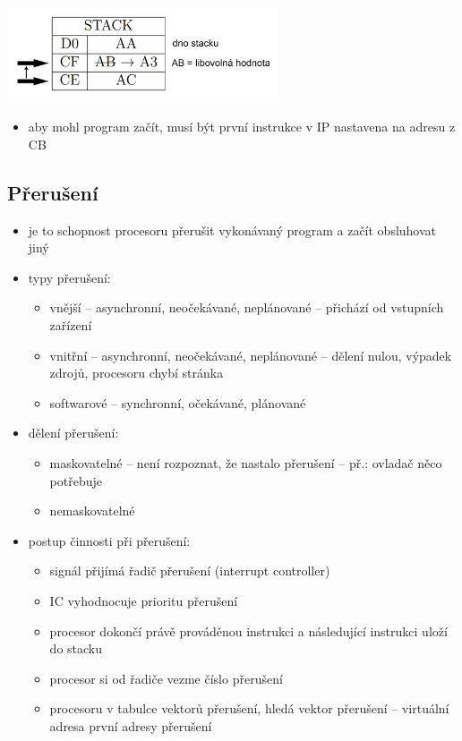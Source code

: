 \documentclass[a4paper,12pt]{article}
\providecommand{\tightlist}{%
\setlength{\itemsep}{0pt}\setlength{\parskip}{0pt}}
\begin{document}
\includegraphics[width=8cm]{ref/podprogram-stack.png}

\begin{itemize}
\tightlist
\item aby mohl program začít, musí být první instrukce v IP nastavena na
  adresu z CB
\end{itemize}

\subsection{Přerušení}

\begin{itemize}
\tightlist
\item je to schopnost procesoru přerušit vykonávaný program a začít
  obsluhovat jiný
\item typy přerušení:

  \begin{itemize}
  \tightlist
  \item vnější -- asynchronní, neočekávané, neplánované -- přichází od
    vstupních zařízení
  \item vnitřní -- asynchronní, neočekávané, neplánované -- dělení nulou,
    výpadek zdrojů, procesoru chybí stránka
  \item softwarové -- synchronní, očekávané, plánované
  \end{itemize}
\item dělení přerušení:

  \begin{itemize}
  \tightlist
  \item maskovatelné -- není rozpoznat, že nastalo přerušení -- př.: ovladač
    něco potřebuje
  \item nemaskovatelné
  \end{itemize}
\item postup činnosti při přerušení:

  \begin{itemize}
  \tightlist
  \item signál přijímá řadič přerušení (interrupt controller)
  \item IC vyhodnocuje prioritu přerušení
  \item procesor dokončí právě prováděnou instrukci a následující instrukci
    uloží do stacku
  \item procesor si od řadiče vezme číslo přerušení
  \item procesoru v tabulce vektorů přerušení, hledá vektor přerušení --
    virtuální adresa první adresy přerušení
  \end{itemize}
\end{itemize}
\end{document}
